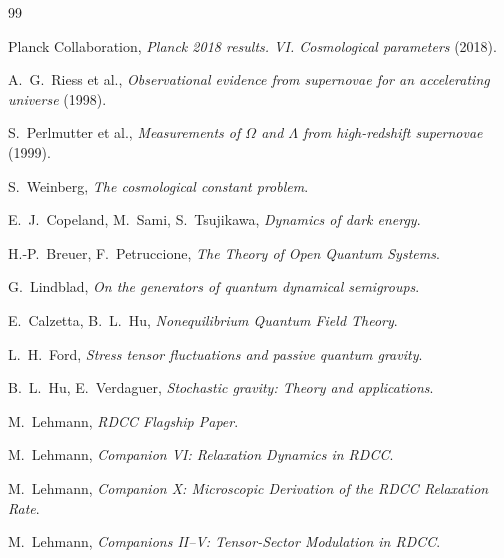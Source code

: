 \documentclass[11pt,a4paper]{article}
\begin{document}
\begin{thebibliography}{99}

Planck Collaboration,
\textit{Planck 2018 results. VI. Cosmological parameters} (2018).

A.~G.~Riess et al.,
\textit{Observational evidence from supernovae for an accelerating universe}
(1998).

S.~Perlmutter et al.,
\textit{Measurements of $\Omega$ and $\Lambda$ from high-redshift supernovae}
(1999).

S.~Weinberg,
\textit{The cosmological constant problem}.

E.~J.~Copeland, M.~Sami, S.~Tsujikawa,
\textit{Dynamics of dark energy}.

H.-P.~Breuer, F.~Petruccione,
\textit{The Theory of Open Quantum Systems}.

G.~Lindblad,
\textit{On the generators of quantum dynamical semigroups}.

E.~Calzetta, B.~L.~Hu,
\textit{Nonequilibrium Quantum Field Theory}.

L.~H.~Ford,
\textit{Stress tensor fluctuations and passive quantum gravity}.

B.~L.~Hu, E.~Verdaguer,
\textit{Stochastic gravity: Theory and applications}.

M.~Lehmann,
\textit{RDCC Flagship Paper}.

M.~Lehmann,
\textit{Companion VI: Relaxation Dynamics in RDCC}.

M.~Lehmann,
\textit{Companion X: Microscopic Derivation of the RDCC Relaxation Rate}.

M.~Lehmann,
\textit{Companions II–V: Tensor-Sector Modulation in RDCC}.
\end{thebibliography}
\end{document}

